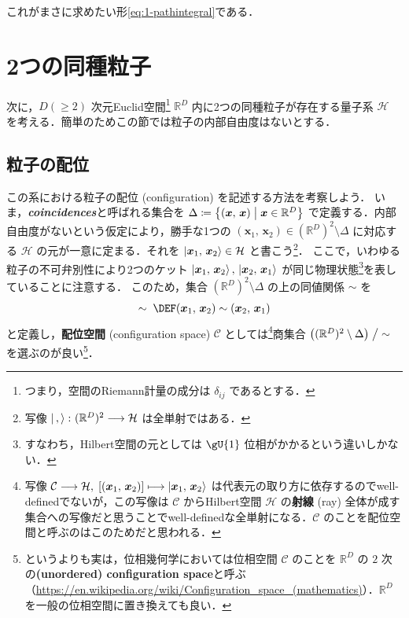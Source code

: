 \documentclass[TQFT_main]{subfiles}
\begin{document}
これがまさに求めたい形\eqref{eq:1-pathintegral}である．

\section{2つの同種粒子}

次に，$D (\ge 2)$ 次元Euclid空間\footnote{つまり，空間のRiemann計量の成分は $\delta_{ij}$ であるとする．} $\mathbb{R}^D$ 内に2つの同種粒子が存在する量子系 $\mathcal{H}$ を考える．簡単のためこの節では粒子の内部自由度はないとする．

\subsection{粒子の配位}

この系における粒子の配位 (configuration) を記述する方法を考察しよう．
いま，\textit{\textbf{coincidences}}と呼ばれる集合を
$\Delta \coloneqq \bigl\{ (\bm{x},\, \bm{x}) \bigm| \bm{x} \in \mathbb{R}^D\bigr\}$
で定義する．内部自由度がないという仮定により，勝手な1つの $(\bm{x}_1,\, \bm{x}_2) \in (\mathbb{R}^D)^2 \setminus \Delta$ に対応する $\mathcal{H}$ の元が一意に定まる．それを $\ket{\bm{x}_1,\, \bm{x}_2} \in \mathcal{H}$ と書こう\footnote{写像 $\ket{\,,\, } \colon (\mathbb{R}^D)^2 \longrightarrow \mathcal{H}$ は全単射ではある．}．
ここで，いわゆる粒子の不可弁別性により2つのケット $\ket{\bm{x}_1,\, \bm{x}_2},\, \ket{\bm{x}_2,\, \bm{x}_1}$ が同じ物理状態\footnote{すなわち，Hilbert空間の元としては $\gU{1}$ 位相がかかるという違いしかない．}を表していることに注意する．
このため，集合 $(\mathbb{R}^D)^2 \setminus \Delta$ の上の同値関係 $\sim$ を
\begin{align}
    \sim\; \DEF (\bm{x}_1,\, \bm{x}_2) \sim (\bm{x}_2,\, \bm{x}_1)
\end{align}
と定義し，\textbf{配位空間} (configuration space) $\mathcal{C}$ としては\footnote{写像 $\mathcal{C} \longrightarrow \mathcal{H},\; [(\bm{x}_1,\, \bm{x}_2)] \longmapsto \ket{\bm{x}_1,\, \bm{x}_2}$ は代表元の取り方に依存するのでwell-definedでないが，この写像は $\mathcal{C}$ からHilbert空間 $\mathcal{H}$ の\textbf{射線} (ray) 全体が成す集合への写像だと思うことでwell-definedな全単射になる．$\mathcal{C}$ のことを配位空間と呼ぶのはこのためだと思われる．}商集合 $\bigl((\mathbb{R}^D)^2 \setminus \Delta\bigr) \bigm/ {\sim}$ を選ぶのが良い\footnote{というよりも実は，位相幾何学においては位相空間 $\mathcal{C}$ のことを $\mathbb{R}^D$ の $2$ 次の\textbf{(unordered) configuration space}と呼ぶ（\url{https://en.wikipedia.org/wiki/Configuration_space_(mathematics)}）．$\mathbb{R}^D$ を一般の位相空間に置き換えても良い．}．
\end{document}

